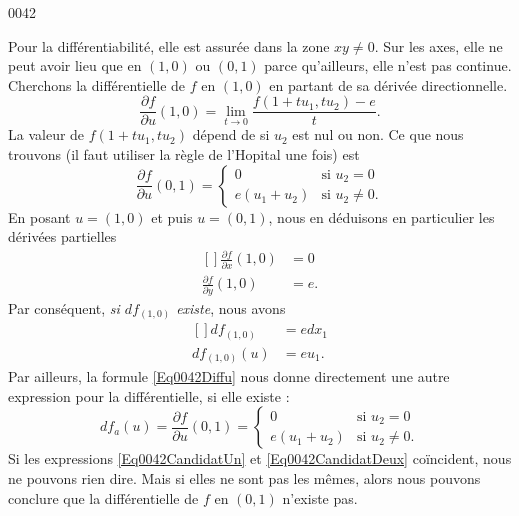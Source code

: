 \begin{corrige}{0042}
\begin{alternative}
\begin{enumerate}
Pour la différentiabilité, elle est assurée dans la zone $xy\neq 0$. Sur les axes, elle ne peut avoir lieu que en $(1,0)$ ou $(0,1)$ parce qu'ailleurs, elle n'est pas continue. Cherchons la différentielle de $f$ en $(1,0)$ en partant de sa dérivée directionnelle.
\begin{equation}
	\frac{ \partial f }{ \partial u }(1,0)=\lim_{t\to 0}\frac{ f(1+tu_1,tu_2)-e }{ t }.
\end{equation}
La valeur de $f(1+tu_1,tu_2)$ dépend de si $u_2$ est nul ou non. Ce que nous trouvons (il faut utiliser la règle de l'Hopital une fois) est
\begin{equation}		\label{Eq0042Diffu}
	\frac{ \partial f }{ \partial u }(0,1)=
\begin{cases}
	0	&	\text{si }u_2=0\\
	e(u_1+u_2)	&	 \text{si }u_2\neq 0.
\end{cases}
\end{equation}
En posant $u=(1,0)$ et puis $u=(0,1)$, nous en déduisons en particulier les dérivées partielles
\begin{equation}
	\begin{aligned}[]
		\frac{ \partial f }{ \partial x }(1,0)	&=0\\
		\frac{ \partial f }{ \partial y }(1,0)	&=e.
	\end{aligned}
\end{equation}
Par conséquent, \emph{si $df_{(1,0)}$ existe}, nous avons
\begin{equation}		\label{Eq0042CandidatUn}
	\begin{aligned}[]
		df_{(1,0)}	&=edx_1\\
		df_{(1,0)}(u)	&=eu_1.
	\end{aligned}
\end{equation}
Par ailleurs, la formule \eqref{Eq0042Diffu} nous donne directement une autre expression pour la différentielle, si elle existe :
\begin{equation}		\label{Eq0042CandidatDeux}
	df_a(u)=\frac{ \partial f }{ \partial u }(0,1)=
\begin{cases}
	0	&	\text{si }u_2=0\\
	e(u_1+u_2)	&	 \text{si }u_2\neq 0.
\end{cases}
\end{equation}
Si les expressions \eqref{Eq0042CandidatUn} et \eqref{Eq0042CandidatDeux} coïncident, nous ne pouvons rien dire. Mais si elles ne sont pas les mêmes, alors nous pouvons conclure que la différentielle de $f$ en $(0,1)$ n'existe pas.


\end{enumerate}
\end{alternative}
\end{corrige}
